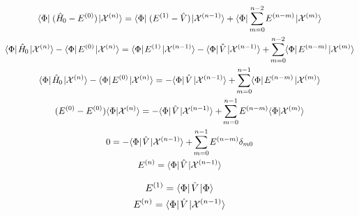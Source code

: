 \documentclass[thesis.tex]{subfiles}
\begin{document}
\begin{gather}
  \refbra\mathop{(\Ham_{0} - E^{(0)})}\ket{\mathcal{X}^{(n)}} = \refbra\mathop{(E^{(1)} - \hat{V})}\ket{\mathcal{X}^{(n-1)}} + \refbra\sum^{n-2}_{\mathclap{m=0}} E^{(n-m)}\ket{\mathcal{X}^{(m)}} \\
  \refbra\Ham_{0}\ket{\mathcal{X}^{(n)}} - \refbra E^{(0)}\ket{\mathcal{X}^{(n)}} = \refbra E^{(1)}\ket{\mathcal{X}^{(n-1)}} - \refbra\hat{V}\ket{\mathcal{X}^{(n-1)}} + \sum^{n-2}_{\mathclap{m=0}}\refbra E^{(n-m)}\ket{\mathcal{X}^{(m)}} \\
  \refbra\Ham_{0}\ket{\mathcal{X}^{(n)}} - \refbra E^{(0)}\ket{\mathcal{X}^{(n)}} = - \refbra\hat{V}\ket{\mathcal{X}^{(n-1)}} + \sum^{n-1}_{\mathclap{m=0}}\refbra E^{(n-m)}\ket{\mathcal{X}^{(m)}} \\
  \mathop{(E^{(0)} - E^{(0)})}\braket{\Phi}{\mathcal{X}^{(n)}} = - \refbra\hat{V}\ket{\mathcal{X}^{(n-1)}} + \sum^{n-1}_{\mathclap{m=0}}E^{(n-m)}\braket{\Phi}{\mathcal{X}^{(m)}} \\
  0 = - \refbra\hat{V}\ket{\mathcal{X}^{(n-1)}} + \sum^{n-1}_{\mathclap{m=0}}E^{(n-m)}\delta_{m0} \\
  E^{(n)} = \refbra\hat{V}\ket{\mathcal{X}^{(n-1)}}
\end{gather}

\begin{gather}
  E^{(1)} = \langle \Phi |\hspace{1pt}\hat{V}\hspace{1pt}\lvert \Phi \rangle \\
  E^{(n)} = \langle \Phi |\hspace{1pt}\hat{V}\hspace{1pt}\lvert \mathcal{X}^{(n-1)} \rangle
\end{gather}
\end{document}

